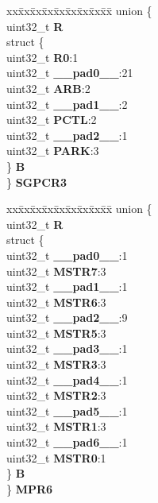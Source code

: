 \begin{DoxyCompactItemize}
\begin{tabbing}
\end{tabbing}\item 
\mbox{\label{structXBAR__tag_a2aed0f910c48332b40020a4297e17c93}} 
\begin{tabbing}
xx\=xx\=xx\=xx\=xx\=xx\=xx\=xx\=xx\=\kill
union \{\\
\>uint32\_t {\bfseries R}\\
\>struct \{\\
\>\>uint32\_t {\bfseries R0}:1\\
\>\>uint32\_t {\bfseries \_\_pad0\_\_}:21\\
\>\>uint32\_t {\bfseries ARB}:2\\
\>\>uint32\_t {\bfseries \_\_pad1\_\_}:2\\
\>\>uint32\_t {\bfseries PCTL}:2\\
\>\>uint32\_t {\bfseries \_\_pad2\_\_}:1\\
\>\>uint32\_t {\bfseries PARK}:3\\
\>\} {\bfseries B}\\
\} {\bfseries SGPCR3}\\

\end{tabbing}\item 
\mbox{\label{structXBAR__tag_a9653fe3115a2edea3204f5871065f12c}} 
\begin{tabbing}
xx\=xx\=xx\=xx\=xx\=xx\=xx\=xx\=xx\=\kill
union \{\\
\>uint32\_t {\bfseries R}\\
\>struct \{\\
\>\>uint32\_t {\bfseries \_\_pad0\_\_}:1\\
\>\>uint32\_t {\bfseries MSTR7}:3\\
\>\>uint32\_t {\bfseries \_\_pad1\_\_}:1\\
\>\>uint32\_t {\bfseries MSTR6}:3\\
\>\>uint32\_t {\bfseries \_\_pad2\_\_}:9\\
\>\>uint32\_t {\bfseries MSTR5}:3\\
\>\>uint32\_t {\bfseries \_\_pad3\_\_}:1\\
\>\>uint32\_t {\bfseries MSTR3}:3\\
\>\>uint32\_t {\bfseries \_\_pad4\_\_}:1\\
\>\>uint32\_t {\bfseries MSTR2}:3\\
\>\>uint32\_t {\bfseries \_\_pad5\_\_}:1\\
\>\>uint32\_t {\bfseries MSTR1}:3\\
\>\>uint32\_t {\bfseries \_\_pad6\_\_}:1\\
\>\>uint32\_t {\bfseries MSTR0}:1\\
\>\} {\bfseries B}\\
\} {\bfseries MPR6}\\


\end{tabbing}
\end{DoxyCompactItemize}

